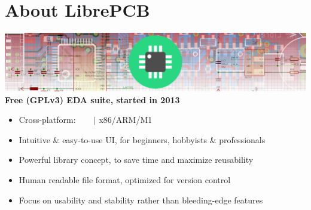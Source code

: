 \section{About LibrePCB}

\begin{frame}{\secname}
  \includegraphics[width=\linewidth]{images/about_header.png}
  \linebreak\linebreak
  \textbf{Free (GPLv3) EDA suite, started in 2013}
  \begin{itemize}
    \item Cross-platform: \faWindows\ \faApple\ \faLinux\ \faFreebsd
          \hspace{0.3em} $|$ x86/ARM/M1
    \item Intuitive \& easy-to-use UI,
          {\footnotesize for beginners, hobbyists \& professionals}
    \item Powerful library concept,
          {\footnotesize to save time and maximize reusability}
    \item Human readable file format,
          {\footnotesize optimized for version control}
    \item Focus on usability and stability
          {\footnotesize rather than bleeding-edge features}
  \end{itemize}
\end{frame}
